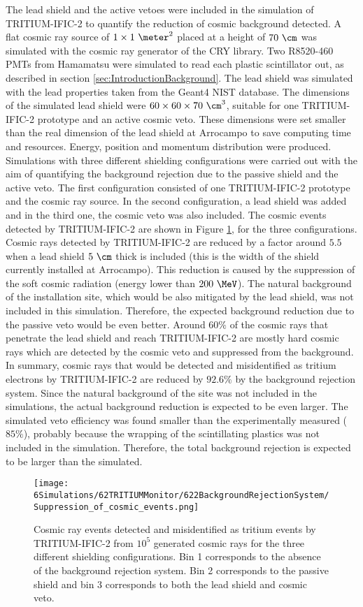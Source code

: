 The lead shield and the active vetoes were included in the simulation of TRITIUM-IFIC-2 to quantify the reduction of cosmic background detected. A flat cosmic ray source of $1 \times 1~\meter^2$ placed at a height of $70~\cm$ was simulated with the cosmic ray generator of the CRY library. Two R8520-460 PMTs from Hamamatsu were simulated to read each plastic scintillator out, as described in section \ref{sec:IntroductionBackground}. The lead shield was simulated with the lead properties taken from the Geant4 NIST database. The dimensions of the simulated lead shield were $60 \times 60 \times 70~\cm^3$, suitable for one TRITIUM-IFIC-2 prototype and an active cosmic veto. These dimensions were set smaller than the real dimension of the lead shield at Arrocampo to save computing time and resources. Energy, position and momentum distribution were produced. Simulations with three different shielding configurations were carried out with the aim of quantifying the background rejection due to the passive shield and the active veto. The first configuration consisted of one TRITIUM-IFIC-2 prototype and the cosmic ray source. In the second configuration, a lead shield was added and in the third one, the cosmic veto was also included. The cosmic events detected by TRITIUM-IFIC-2 are shown in Figure \ref{fig:CosmicEventsSuppressionSimulated}, for the three configurations. Cosmic rays detected by TRITIUM-IFIC-2 are reduced by a factor around $5.5$ when a lead shield $5~\cm$ thick is included (this is the width of the shield currently installed at Arrocampo). This reduction is caused by the suppression of the soft cosmic radiation (energy lower than $200~\MeV$). The natural background of the installation site, which would be also mitigated by the lead shield, was not included in this simulation. Therefore, the expected background reduction due to the passive veto would be even better. Around $60\%$ of the cosmic rays that penetrate the lead shield and reach TRITIUM-IFIC-2 are mostly hard cosmic rays which are detected by the cosmic veto and suppressed from the background. In summary, cosmic rays that would be detected and misidentified as tritium electrons by TRITIUM-IFIC-2 are reduced by $92.6\%$ by the background rejection system. Since the natural background of the site was not included in the simulations, the actual background reduction is expected to be even larger. The simulated veto efficiency was found smaller than the experimentally measured ($85\%$), probably because the wrapping of the scintillating plastics was not included in the simulation. Therefore, the total background rejection is expected to be larger than the simulated.

\begin{figure}[h]
\texttt{[image: 6Simulations/62TRITIUMMonitor/622BackgroundRejectionSystem/Suppression\_of\_cosmic\_events.png]}
\centering
\caption{Cosmic ray events detected and misidentified as tritium events by TRITIUM-IFIC-2 from $10^5$ generated cosmic rays for the three different shielding configurations. Bin 1 corresponds to the absence of the background rejection system. Bin 2 corresponds to the passive shield and bin 3 corresponds to both the lead shield and cosmic veto.  \label{fig:CosmicEventsSuppressionSimulated}}
\end{figure}
